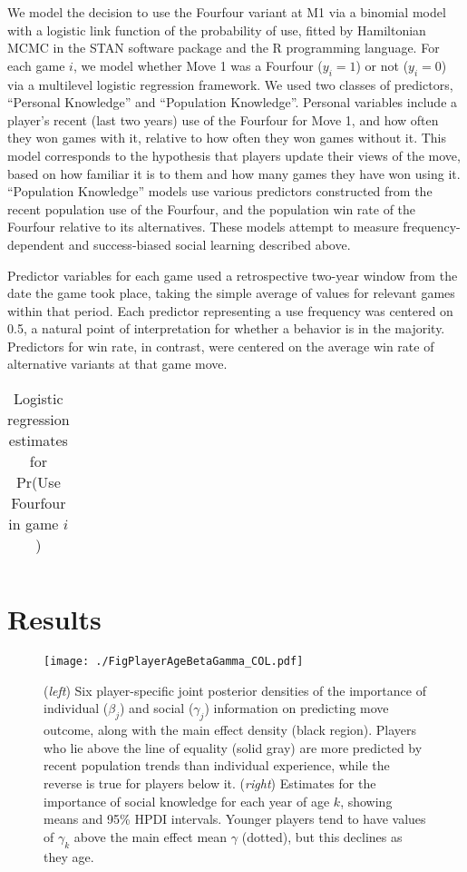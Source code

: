 \documentclass[reqno,12pt]{amsart}
\begin{document}
We model the decision to use the Fourfour variant at M1 via a binomial
model with a logistic link function of the probability of use, fitted by
Hamiltonian MCMC in the STAN software package \citep{stan2013stan} and
the R programming language. For each game \(i\), we model whether Move 1
was a Fourfour (\(y_i=1\)) or not (\(y_i=0\)) via a multilevel logistic
regression framework. We used two classes of predictors, ``Personal
Knowledge'' and ``Population Knowledge''. Personal variables include a
player's recent (last two years) use of the Fourfour for Move 1, and how
often they won games with it, relative to how often they won games
without it. This model corresponds to the hypothesis that players update
their views of the move, based on how familiar it is to them and how
many games they have won using it. ``Population Knowledge'' models use
various predictors constructed from the recent population use of the
Fourfour, and the population win rate of the Fourfour relative to its
alternatives. These models attempt to measure frequency-dependent and
success-biased social learning described above.

Predictor variables for each game used a retrospective two-year window
from the date the game took place, taking the simple average of values
for relevant games within that period. Each predictor representing a use
frequency was centered on 0.5, a natural point of interpretation for
whether a behavior is in the majority. Predictors for win rate, in
contrast, were centered on the average win rate of alternative variants
at that game move.

\begin{table}[t]
  \centering
    \begin{tabular}{lrr}
    
    \end{tabular}%
  \caption{Logistic regression estimates for Pr(Use Fourfour in game $i$)}
\end{table}

\section{Results}\label{results}

\begin{figure}[t]
  \begin{center}
    \texttt{[image: ./FigPlayerAgeBetaGamma\_COL.pdf]}
    \caption{(\textit{left}) Six player-specific joint posterior densities of the importance of individual ($\beta_j$) and social ($\gamma_j$) information on predicting move outcome, along with the main effect density (black region). Players who lie above the line of equality (solid gray) are more predicted by recent population trends than individual experience, while the reverse is true for players below it. (\textit{right}) Estimates for the importance of social knowledge for each year of age $k$, showing means and 95\% HPDI intervals. Younger players tend to have values of $\gamma_k$ above the main effect mean $\gamma$ (dotted), but this declines as they age.}
  \label{FigPlayerAgeBetaGamma}
  \end{center}
\end{figure}
\end{document}
